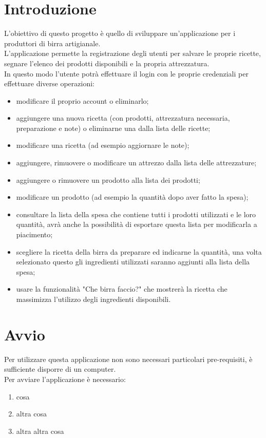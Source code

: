 \documentclass[a4paper, titlepage]{article}
\begin{document}
\section{Introduzione}
L'obiettivo di questo progetto è quello di sviluppare un'applicazione per i produttori di birra artigianale.\\
L'applicazione permette la registrazione degli utenti per salvare le proprie ricette, segnare l'elenco dei prodotti disponibili e la propria attrezzatura.\\
In questo modo l'utente potrà effettuare il login con le proprie credenziali per effettuare diverse operazioni:
\begin{itemize}
    \item modificare il proprio account o eliminarlo;
    \item aggiungere una nuova ricetta (con prodotti, attrezzatura necessaria, preparazione e note) o eliminarne una dalla lista delle ricette;
    \item modificare una ricetta (ad esempio aggiornare le note);
    \item aggiungere, rimuovere o modificare un attrezzo dalla lista delle attrezzature;
    \item aggiungere o rimuovere un prodotto alla lista dei prodotti;
    \item modificare un prodotto (ad esempio la quantità dopo aver fatto la spesa);
    \item consultare la lista della spesa che contiene tutti i prodotti utilizzati e le loro quantità, avrà anche la possibilità di esportare questa lista per modificarla a piacimento;
    \item scegliere la ricetta della birra da preparare ed indicarne la quantità, una volta selezionato questo gli ingredienti utilizzati saranno aggiunti alla lista della spesa;
    \item usare la funzionalità "Che birra faccio?" che mostrerà la ricetta che massimizza l'utilizzo degli ingredienti disponibili.
\end{itemize}

\newpage

\section{Avvio}
Per utilizzare questa applicazione non sono necessari particolari pre-requisiti, è sufficiente disporre di un computer.\\
Per avviare l'applicazione è necessario:
\begin{enumerate}
    \item cosa
    \item altra cosa
    \item altra altra cosa
\end{enumerate}
\end{document}

